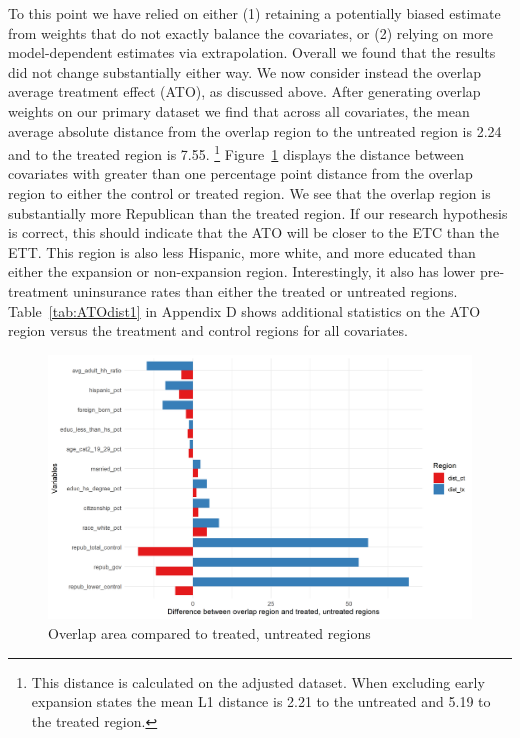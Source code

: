 To this point we have relied on either (1) retaining a potentially biased estimate from weights that do not exactly balance the covariates, or (2) relying on more model-dependent estimates via extrapolation. Overall we found that the results did not change substantially either way. We now consider instead the overlap average treatment effect (ATO), as discussed above. After generating overlap weights on our primary dataset we find that across all covariates, the mean average absolute distance from the overlap region to the untreated region is 2.24 and to the treated region is 7.55. \footnote{This distance is calculated on the adjusted dataset. When excluding early expansion states the mean L1 distance is 2.21 to the untreated and 5.19 to the treated region.} Figure~\ref{fig:ATOimbalance} displays the distance between covariates with greater than one percentage point distance from the overlap region to either the control or treated region. We see that the overlap region is substantially more Republican than the treated region. If our research hypothesis is correct, this should indicate that the ATO will be closer to the ETC than the ETT. This region is also less Hispanic, more white, and more educated than either the expansion or non-expansion region. Interestingly, it also has lower pre-treatment uninsurance rates than either the treated or untreated regions. Table~\ref{tab:ATOdist1} in Appendix D shows additional statistics on the ATO region versus the treatment and control regions for all covariates.

\begin{figure}[H]
\begin{center}
    \caption{Overlap area compared to treated, untreated regions}
    \label{fig:ATOimbalance}
    \includegraphics[scale=0.6]{01_plots/oate-imbalances-c1.png}
\end{center}
\end{figure}

